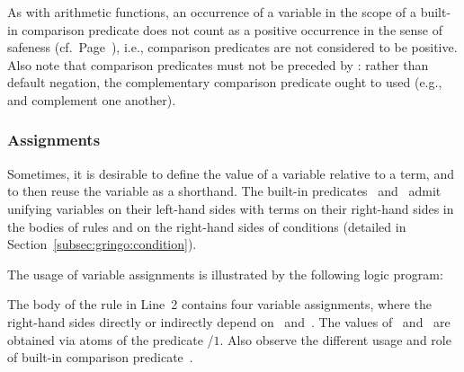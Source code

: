 \begin{Note}
As with arithmetic functions,
an occurrence of a variable in the scope of a built-in comparison predicate
does not count as a positive occurrence in the sense of safeness (cf.\ Page~\pageref{pg:safe}),
i.e.,
comparison predicates are not considered to be positive.
Also note that comparison predicates must not be preceded by :
rather than default negation,
the complementary comparison predicate ought to used
(e.g., \code{<} and \code{>=} complement one another).
%
\end{Note}


\subsubsection{Assignments}\label{subsec:gringo:assign}

Sometimes, it is desirable to define the value of a variable relative
to a term, and to then reuse the variable as a shorthand.
The built-in predicates~\code{=} and~\code{:=} admit unifying
variables on their left-hand sides with terms on their right-hand sides
in the bodies of rules and on the right-hand sides of conditions
(detailed in Section~\ref{subsec:gringo:condition}).

\begin{example}\label{ex:assign}
The usage of variable assignments is illustrated by the following logic program:%
%
%

%
The body of the rule in Line~2 contains four variable assignments,
where the right-hand sides directly or indirectly
depend on~ and~.
The values of~ and~ are obtained via atoms of the predicate /$1$.
Also observe the different usage and role of built-in comparison predicate~\code{==}.
\eexample
\end{example}

